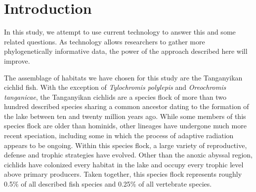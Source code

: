 \section{Introduction}


In this study, we attempt to use current technology to answer this and some related questions. As technology allows researchers to gather more phylogenetically informative data, the power of the approach described here will improve. 

The assemblage of habitats we have chosen for this study are the Tanganyikan cichlid fish. With the exception of {\em Tylochromis polylepis} and {\em Oreochromis tanganicae}, the Tanganyikan cichlids are a species flock of more than two hundred described species sharing a common ancestor dating to the formation of the lake between ten and twenty million years ago. While some members of this species flock are older than hominids, other lineages have undergone much more recent speciation, including some in which the process of adaptive radiation appears to be ongoing. Within this species flock, a large variety of reproductive, defense and trophic strategies have evolved. Other than the anoxic abyssal region, cichlids have colonized every habitat in the lake and occupy every trophic level above primary producers. Taken together, this species flock represents roughly 0.5\% of all described fish species and 0.25\% of all vertebrate species.